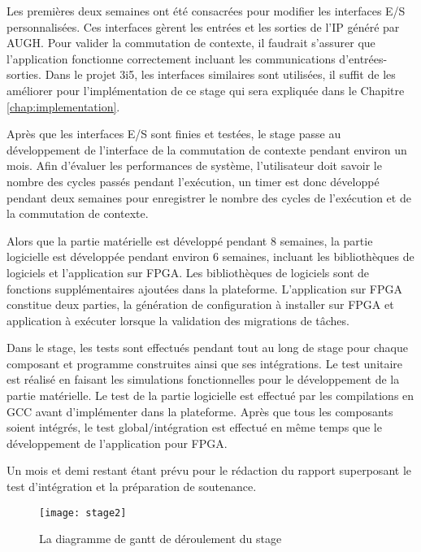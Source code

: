 Les premières deux semaines ont été consacrées pour modifier les interfaces E/S personnalisées. Ces interfaces
gèrent les entrées et les sorties de l'IP généré par AUGH. Pour valider la commutation de contexte,
il faudrait s'assurer que l'application fonctionne correctement incluant les communications d'entrées-sorties.
Dans le projet 3i5, les interfaces similaires sont utilisées, il suffit de les améliorer pour l'implémentation
de ce stage qui sera expliquée dans le Chapitre \ref{chap:implementation}.

Après que les interfaces E/S sont finies et testées, le stage passe au développement de l'interface de la commutation
de contexte pendant environ un mois. Afin d'évaluer les performances de système, l'utilisateur doit savoir le
nombre des cycles passés pendant l'exécution, un timer est donc développé pendant deux semaines pour enregistrer
le nombre des cycles de l'exécution et de la commutation de contexte. 

Alors que la partie matérielle est développé pendant
8 semaines, la partie logicielle est développée pendant environ 6 semaines, incluant les bibliothèques de logiciels et l'application sur FPGA.
Les bibliothèques de logiciels sont de fonctions supplémentaires ajoutées dans la plateforme. L'application sur FPGA
constitue deux parties, la génération de configuration à installer sur FPGA et application à exécuter lorsque la validation des
migrations de tâches.

Dans le stage, les tests sont effectués pendant tout au long de stage pour chaque composant et programme construites ainsi que ses intégrations. 
Le test unitaire est réalisé en faisant les simulations fonctionnelles pour le développement de la partie matérielle.
Le test de la partie logicielle est effectué par les compilations en GCC avant d'implémenter dans la plateforme.
Après que tous les composants soient intégrés,
le test global/intégration est effectué en même temps que le développement de l'application pour FPGA. 

Un mois et demi restant étant prévu pour le rédaction du rapport superposant le test d'intégration et la préparation
de soutenance.

\begin{figure}[h]
	\centering
	\texttt{[image: stage2]}
	\caption{La diagramme de gantt de déroulement du stage}
	\label{fig:gantt}
	\vspace{-2mm}
\end{figure}

